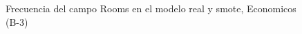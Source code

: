\begin{figure}[H]
    \centering
    
    \caption{Frecuencia del campo Rooms en el modelo real y smote, Economicos (B-3)}
    \label{frecuency-Rooms-smote-enc}
\end{figure}